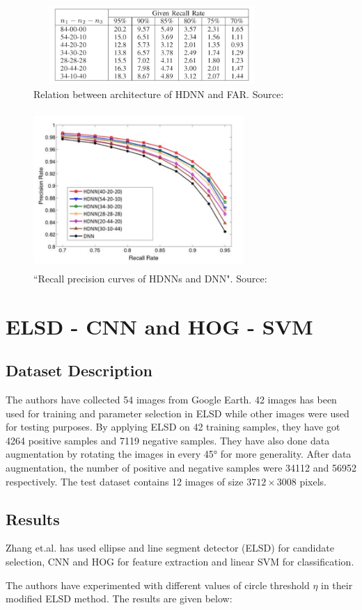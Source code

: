 \begin{figure}[!htbp]
\centerline{\includegraphics[height=30mm,width=90mm]{img/fig16.png}}
\caption{Relation between architecture of HDNN and FAR. Source: \cite{b8}}
\label{fig16}
\end{figure}

\begin{figure}[!htbp]
\centerline{\includegraphics[height=60mm,width=80mm]{img/fig17.png}}
\caption{``Recall precision curves of HDNNs and DNN". Source: \cite{b8}}
\label{fig17}
\end{figure}


\section{ELSD - CNN and HOG - SVM}

\subsection{Dataset Description}
The authors have collected 54 images from Google Earth. 42 images has been used for training and parameter selection in ELSD while other images were used for testing purposes. By applying ELSD on 42 training samples, they have got 4264 positive samples and 7119 negative samples. They have also done data augmentation by rotating the images in every \ang{45} for more generality. After data augmentation, the number of positive and negative samples were 34112 and 56952 respectively. The test dataset contains 12 images of size $3712\times 3008$ pixels.

\subsection{Results}
Zhang et.al.\cite{b6} has used ellipse and line segment detector (ELSD) for candidate selection, CNN and HOG for feature extraction and linear SVM for classification. 
\par The authors have experimented with different values of circle threshold $\eta$ in their modified ELSD method. The results are given below: 

